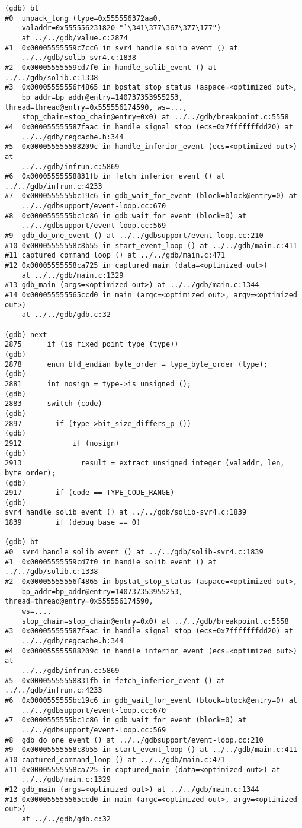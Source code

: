 \documentclass{report}
\begin{document}
\begin{verbatim}
(gdb) bt
#0  unpack_long (type=0x555556372aa0, 
    valaddr=0x555556231820 "`\341\377\367\377\177")
    at ../../gdb/value.c:2874
#1  0x00005555559c7cc6 in svr4_handle_solib_event () at 
    ../../gdb/solib-svr4.c:1838
#2  0x00005555559cd7f0 in handle_solib_event () at ../../gdb/solib.c:1338
#3  0x00005555556f4865 in bpstat_stop_status (aspace=<optimized out>, 
    bp_addr=bp_addr@entry=140737353955253, thread=thread@entry=0x555556174590, ws=..., 
    stop_chain=stop_chain@entry=0x0) at ../../gdb/breakpoint.c:5558
#4  0x000055555587faac in handle_signal_stop (ecs=0x7fffffffdd20) at 
    ../../gdb/regcache.h:344
#5  0x000055555588209c in handle_inferior_event (ecs=<optimized out>) at 
    ../../gdb/infrun.c:5869
#6  0x00005555558831fb in fetch_inferior_event () at ../../gdb/infrun.c:4233
#7  0x0000555555bc19c6 in gdb_wait_for_event (block=block@entry=0) at 
    ../../gdbsupport/event-loop.cc:670
#8  0x0000555555bc1c86 in gdb_wait_for_event (block=0) at 
    ../../gdbsupport/event-loop.cc:569
#9  gdb_do_one_event () at ../../gdbsupport/event-loop.cc:210
#10 0x00005555558c8b55 in start_event_loop () at ../../gdb/main.c:411
#11 captured_command_loop () at ../../gdb/main.c:471
#12 0x00005555558ca725 in captured_main (data=<optimized out>) 
    at ../../gdb/main.c:1329
#13 gdb_main (args=<optimized out>) at ../../gdb/main.c:1344
#14 0x000055555565ccd0 in main (argc=<optimized out>, argv=<optimized out>) 
    at ../../gdb/gdb.c:32

(gdb) next
2875	  if (is_fixed_point_type (type))
(gdb) 
2878	  enum bfd_endian byte_order = type_byte_order (type);
(gdb) 
2881	  int nosign = type->is_unsigned ();
(gdb) 
2883	  switch (code)
(gdb) 
2897		if (type->bit_size_differs_p ())
(gdb) 
2912		    if (nosign)
(gdb) 
2913		      result = extract_unsigned_integer (valaddr, len, byte_order);
(gdb) 
2917		if (code == TYPE_CODE_RANGE)
(gdb) 
svr4_handle_solib_event () at ../../gdb/solib-svr4.c:1839
1839	    if (debug_base == 0)

(gdb) bt
#0  svr4_handle_solib_event () at ../../gdb/solib-svr4.c:1839
#1  0x00005555559cd7f0 in handle_solib_event () at ../../gdb/solib.c:1338
#2  0x00005555556f4865 in bpstat_stop_status (aspace=<optimized out>, 
    bp_addr=bp_addr@entry=140737353955253, thread=thread@entry=0x555556174590, 
    ws=..., 
    stop_chain=stop_chain@entry=0x0) at ../../gdb/breakpoint.c:5558
#3  0x000055555587faac in handle_signal_stop (ecs=0x7fffffffdd20) at 
    ../../gdb/regcache.h:344
#4  0x000055555588209c in handle_inferior_event (ecs=<optimized out>) at 
    ../../gdb/infrun.c:5869
#5  0x00005555558831fb in fetch_inferior_event () at ../../gdb/infrun.c:4233
#6  0x0000555555bc19c6 in gdb_wait_for_event (block=block@entry=0) at 
    ../../gdbsupport/event-loop.cc:670
#7  0x0000555555bc1c86 in gdb_wait_for_event (block=0) at 
    ../../gdbsupport/event-loop.cc:569
#8  gdb_do_one_event () at ../../gdbsupport/event-loop.cc:210
#9  0x00005555558c8b55 in start_event_loop () at ../../gdb/main.c:411
#10 captured_command_loop () at ../../gdb/main.c:471
#11 0x00005555558ca725 in captured_main (data=<optimized out>) at 
    ../../gdb/main.c:1329
#12 gdb_main (args=<optimized out>) at ../../gdb/main.c:1344
#13 0x000055555565ccd0 in main (argc=<optimized out>, argv=<optimized out>) 
    at ../../gdb/gdb.c:32


\end{verbatim}
\end{document}

